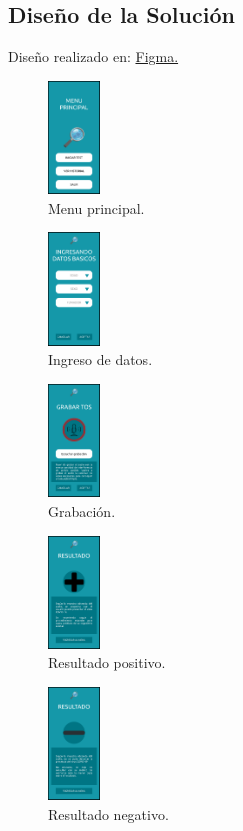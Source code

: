 \documentclass[journal]{IEEEtran}
\begin{document}
\subsection{Diseño de la Solución}
Diseño realizado en: \href{https://www.figma.com/proto/M8RWGFdiOidZSZONJyYMPn/TFG?node-id=2\%3A3&starting-point-node-id=2\%3A3}{Figma.}
\begin{figure}[H]
\centering
\includegraphics[height=3cm]{figma01}
\caption{Menu principal.}
\end{figure}
\begin{figure}[H]
\centering
\includegraphics[height=3cm]{figma02}
\caption{Ingreso de datos.}
\end{figure}
\begin{figure}[H]
\centering
\includegraphics[height=3cm]{figma03}
\caption{Grabación.}
\end{figure}
\begin{figure}[H]
\centering
\includegraphics[height=3cm]{figma04}
\caption{Resultado positivo.}
\end{figure}
\begin{figure}[H]
\centering
\includegraphics[height=3cm]{figma05}
\caption{Resultado negativo.}
\end{figure}
\end{document}
